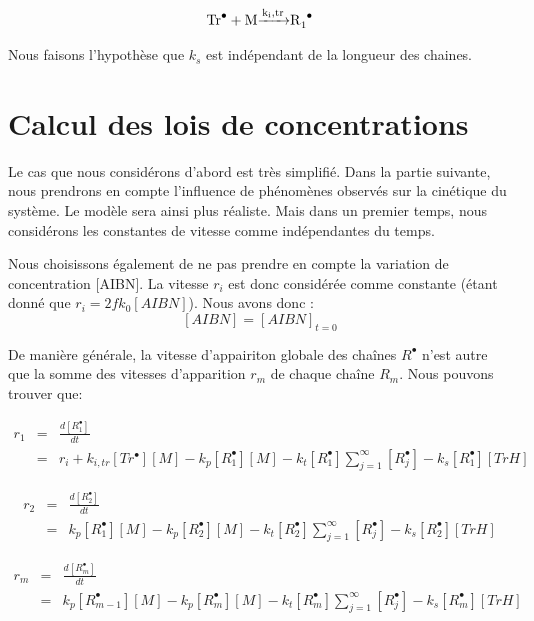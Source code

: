\documentclass[a4paper,oneside,12pt]{article}
\begin{document}
\begin{equation}
\ce{Tr^{\bullet} + M \xrightarrow{k_i,tr} R_{1}^{\bullet}}
\end{equation}

Nous faisons l'hypothèse que $k_s$ est indépendant de la longueur des chaines.

\section{Calcul des lois de concentrations}
Le cas que nous considérons d'abord est très simplifié. Dans la partie suivante, nous prendrons en compte l'influence de phénomènes observés sur la cinétique du système. Le modèle sera ainsi plus réaliste. Mais dans un premier temps, nous considérons les constantes de vitesse comme indépendantes du temps. 

Nous choisissons également de ne pas prendre en compte la variation de concentration [AIBN]. La vitesse $r_i$ est donc considérée comme constante (étant donné que $r_i=2fk_0[AIBN]$).
Nous avons donc : 
$$[AIBN]=[AIBN]_{t=0}$$


De manière générale, la vitesse d'appairiton globale des chaînes $R^{\bullet}$ n'est autre que la somme des vitesses d'apparition $r_{m}$ de chaque chaîne $R_{m}$. Nous pouvons trouver que:

\begin{eqnarray*}
r_{1} &=& \frac{d[R_{1}^{\bullet}]}{dt}\\
      &=& r_{i}+k_{i,tr}[Tr^{\bullet}][M]-k_p[R_{1}^{\bullet}][M]-k_{t}[R_1^{\bullet}]\sum\limits_{j=1}^\infty[R_j^{\bullet}]-k_{s}[R_{1}^{\bullet}][TrH]
\end{eqnarray*}

\begin{eqnarray*}
r_{2} &=& \frac{d[R_{2}^{\bullet}]}{dt}\\
	&=& k_p[R_{1}^{\bullet}][M]-k_p[R_{2}^{\bullet}][M]-k_{t}[R_2^{\bullet}]\sum\limits_{j=1}^\infty[R_j^{\bullet}]-k_{s}[R_{2}^{\bullet}][TrH]
\end{eqnarray*}

\begin{eqnarray*}
r_{m} &=& \frac{d[R_{m}^{\bullet}]}{dt}\\
      &=& k_p[R_{m-1}^{\bullet}][M]-k_p[R_{m}^{\bullet}][M]-k_{t}[R_m^{\bullet}]\sum\limits_{j=1}^\infty[R_j^{\bullet}]-k_{s}[R_{m}^{\bullet}][TrH]
\end{eqnarray*}
\end{document}
